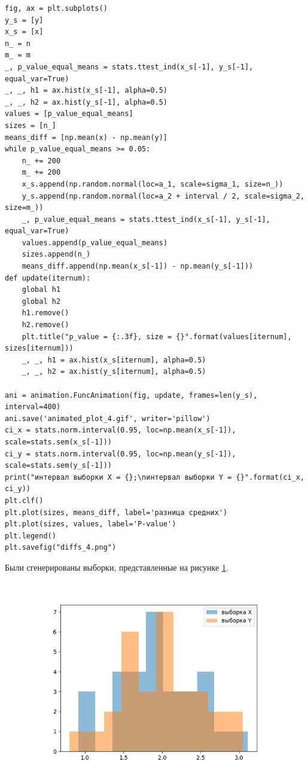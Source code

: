 \documentclass[12pt]{report}
\begin{document}
\begin{lstlisting}[label=lst:gen2,caption=код увеличения размера выборок]
fig, ax = plt.subplots()
y_s = [y]
x_s = [x]
n_ = n
m_ = m
_, p_value_equal_means = stats.ttest_ind(x_s[-1], y_s[-1], equal_var=True)
_, _, h1 = ax.hist(x_s[-1], alpha=0.5)
_, _, h2 = ax.hist(y_s[-1], alpha=0.5)
values = [p_value_equal_means]
sizes = [n_]
means_diff = [np.mean(x) - np.mean(y)]
while p_value_equal_means >= 0.05:
    n_ += 200
    m_ += 200
    x_s.append(np.random.normal(loc=a_1, scale=sigma_1, size=n_))
    y_s.append(np.random.normal(loc=a_2 + interval / 2, scale=sigma_2, size=m_))
    _, p_value_equal_means = stats.ttest_ind(x_s[-1], y_s[-1], equal_var=True)
    values.append(p_value_equal_means)
    sizes.append(n_)
    means_diff.append(np.mean(x_s[-1]) - np.mean(y_s[-1]))
def update(iternum):
    global h1
    global h2
    h1.remove()
    h2.remove()
    plt.title("p_value = {:.3f}, size = {}".format(values[iternum], sizes[iternum]))
    _, _, h1 = ax.hist(x_s[iternum], alpha=0.5)
    _, _, h2 = ax.hist(y_s[iternum], alpha=0.5)

ani = animation.FuncAnimation(fig, update, frames=len(y_s), interval=400)
ani.save('animated_plot_4.gif', writer='pillow')
ci_x = stats.norm.interval(0.95, loc=np.mean(x_s[-1]), scale=stats.sem(x_s[-1]))
ci_y = stats.norm.interval(0.95, loc=np.mean(y_s[-1]), scale=stats.sem(y_s[-1]))
print("интервал выборки X = {};\nинтервал выборки Y = {}".format(ci_x, ci_y))
plt.clf()
plt.plot(sizes, means_diff, label='разница средних')
plt.plot(sizes, values, label='P-value')
plt.legend()
plt.savefig("diffs_4.png")
\end{lstlisting}

\newpage
Были сгенерированы выборки, представленные на рисунке \ref{fig:samples}. 

\begin{figure}[h!]
  \centering
  \includegraphics[width = \linewidth]{samples.png}
  \caption{}
  \label{fig:samples}
\end{figure}
\end{document}
